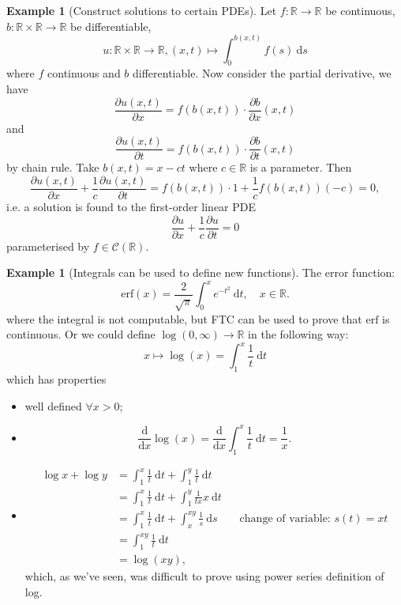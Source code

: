 \documentclass[a4paper]{article}
\newcommand{\erf}{\text{erf}}
\theoremstyle{definition}
\newtheorem{example}[defn]{Example}
\begin{document}
\begin{example}[Construct solutions to certain PDEs]
Let $f:\mathbb R \rightarrow \mathbb R$ be continuous, $b:\mathbb R \times \mathbb R \rightarrow \mathbb R$ be differentiable, 
\[
u:\mathbb R\times \mathbb R \rightarrow \mathbb R, (x,t)\mapsto \int_{0}^{b(x,t)} f(s) \ \mathrm d s
\]
where $f$ continuous and $b$ differentiable. Now consider the partial derivative, we have
\[
\frac{\partial u(x,t)}{\partial x}=f(b(x,t))\cdot \frac{\partial b}{\partial x}(x,t)
\]
and
\[
\frac{\partial u(x,t)}{\partial t}=f(b(x,t))\cdot \frac{\partial b}{\partial t}(x,t)
\]
by chain rule. Take $b(x,t)=x-ct$ where $c\in \mathbb R$ is a parameter. Then
\[
\frac{\partial u(x,t)}{\partial x}+\frac1c \frac{\partial u(x,t)}{\partial t}=f(b(x,t))\cdot 1+\frac1c f(b(x,t))(-c)=0 ,
\]
i.e. a solution is found to the first-order linear PDE
\[
\frac{\partial u}{\partial x}+\frac1c \frac{\partial u}{\partial t}=0
\]
parameterised by $f\in \mathcal C(\mathbb R)$.
\end{example}

\begin{example}[Integrals can be used to define new functions]
The error function:
\[
\erf (x)=\frac{2}{\sqrt{\pi}} \int_0^x e^{-t^2} \ \mathrm d t,\quad x\in \mathbb R.
\]
where the integral is not computable, but FTC can be used to prove that $\erf$ is continuous. Or we could define $\log (0,\infty ) \rightarrow \mathbb R$ in the following way:
\[
x\mapsto \log (x)=\int_1^x \frac{1}{t} \ \mathrm d t
\]
which has properties\begin{itemize}
    \item well defined $\forall x>0$;
    \item
\[
\frac{\mathrm d}{\mathrm d x}\log (x)=\frac{\mathrm d}{\mathrm d x}\int_1^x \frac1t \ \mathrm d t = \frac1x .
\]
    \item
\[
\begin{aligned}\log x+\log y &= \int_1^x \frac1t \ \mathrm d t + \int_1^y \frac1t \ \mathrm d t \\ &=\int_1^x \frac1t \ \mathrm d t + \int_1^y \frac{1}{tx} x \ \mathrm d t\\&= \int_1^x \frac1t \ \mathrm d t + \int_x^{xy}\frac1s \ \mathrm d s \qquad \text{change of variable: }s(t)=xt \\&= \int_1^{xy} \frac1t \ \mathrm d t \\&= \log (xy), \end{aligned}
\]
which, as we've seen, was difficult to prove using power series definition of log.
\end{itemize}
\end{example}
\end{document}
